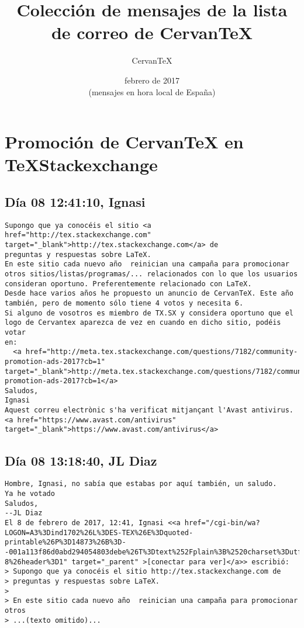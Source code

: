 \documentclass[a4paper,10pt]{article}
\author{CervanTeX}
\title{Colección de mensajes de la lista de correo de CervanTeX}
\date{febrero de 2017\\ \footnotesize{(mensajes en hora local de España)}}
\begin{document}
\maketitle

\tableofcontents

\section{Promoción de CervanTeX en TeXStackexchange}

\subsection{Día 08 12:41:10, Ignasi}

\begin{lstlisting}
Supongo que ya conocéis el sitio <a href="http://tex.stackexchange.com" target="_blank">http://tex.stackexchange.com</a> de 
preguntas y respuestas sobre LaTeX.
En este sitio cada nuevo año  reinician una campaña para promocionar 
otros sitios/listas/programas/... relacionados con lo que los usuarios 
consideran oportuno. Preferentemente relacionado con LaTeX.
Desde hace varios años he propuesto un anuncio de CervanTeX. Este año 
también, pero de momento sólo tiene 4 votos y necesita 6.
Si alguno de vosotros es miembro de TX.SX y considera oportuno que el 
logo de Cervantex aparezca de vez en cuando en dicho sitio, podéis votar 
en:
  <a href="http://meta.tex.stackexchange.com/questions/7182/community-promotion-ads-2017?cb=1" target="_blank">http://meta.tex.stackexchange.com/questions/7182/community-promotion-ads-2017?cb=1</a>
Saludos,
Ignasi
Aquest correu electrònic s'ha verificat mitjançant l'Avast antivirus.
<a href="https://www.avast.com/antivirus" target="_blank">https://www.avast.com/antivirus</a>

\end{lstlisting}

\subsection{Día 08 13:18:40, JL Diaz}

\begin{lstlisting}
Hombre, Ignasi, no sabía que estabas por aquí también, un saludo.
Ya he votado
Saludos,
--JL Diaz
El 8 de febrero de 2017, 12:41, Ignasi <<a href="/cgi-bin/wa?LOGON=A3%3Dind1702%26L%3DES-TEX%26E%3Dquoted-printable%26P%3D14873%26B%3D--001a113f86d0abd294054803debe%26T%3Dtext%252Fplain%3B%2520charset%3Dutf-8%26header%3D1" target="_parent" >[conectar para ver]</a>> escribió:
> Supongo que ya conocéis el sitio http://tex.stackexchange.com de
> preguntas y respuestas sobre LaTeX.
>
> En este sitio cada nuevo año  reinician una campaña para promocionar otros
> ...(texto omitido)...

\end{lstlisting}
\end{document}
